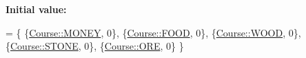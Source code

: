 {\bfseries Initial value\-:}
\begin{DoxyCode}
= \{
    \{\hyperlink{namespaceCourse_a02d49c04029594d4adba79b84bb85f65aff016add6bbbdbb44abf1d2d7f215ec0}{Course::MONEY}, 0\},
    \{\hyperlink{namespaceCourse_a02d49c04029594d4adba79b84bb85f65a7018c47af38bfc1390a89e70b4cf4760}{Course::FOOD}, 0\},
    \{\hyperlink{namespaceCourse_a02d49c04029594d4adba79b84bb85f65a87287be3009253b983ffb2e9f91eef22}{Course::WOOD}, 0\},
    \{\hyperlink{namespaceCourse_a02d49c04029594d4adba79b84bb85f65a8598c3079c2be7785410e724cc190229}{Course::STONE}, 0\},
    \{\hyperlink{namespaceCourse_a02d49c04029594d4adba79b84bb85f65af416a215c7dad21349df38d35be0a1e1}{Course::ORE}, 0\}
\}
\end{DoxyCode}
